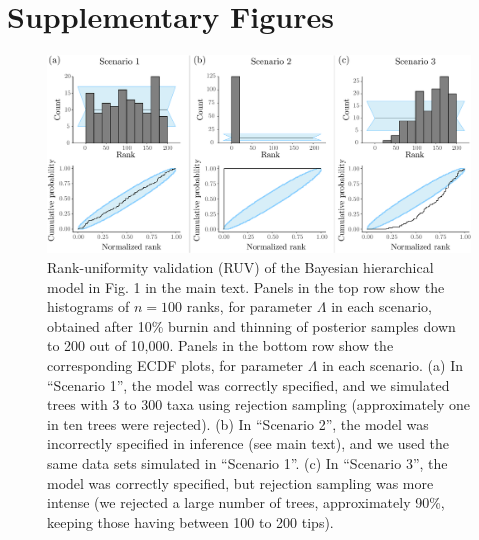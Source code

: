 \documentclass[oneside]{article}
\begin{document}
\newpage
\section{Supplementary Figures}
\label{appendix::sec:supp_figures}

\begin{figure}[!ht]
   \includegraphics[width=\linewidth]{../figures/sbc_Yule_lambda_manual.pdf}
  \caption{Rank-uniformity validation (RUV) of the Bayesian hierarchical model in Fig. 1 in the main text.
    Panels in the top row show the histograms of $n=100$ ranks, for parameter $\Lambda$ in each scenario, obtained after 10\% burnin and thinning of posterior samples down to 200 out of 10,000.
    Panels in the bottom row show the corresponding ECDF plots, for parameter $\Lambda$ in each scenario.
    (a) In ``Scenario 1'', the model was correctly specified, and we simulated trees with 3 to 300 taxa using rejection sampling (approximately one in ten trees were rejected).
    (b) In ``Scenario 2'', the model was incorrectly specified in inference (see main text), and we used the same data sets simulated in ``Scenario 1''.
    (c) In ``Scenario 3'', the model was correctly specified, but rejection sampling was more intense (we rejected a large number of trees, approximately 90\%, keeping those having between 100 to 200 tips).
   }
  \label{supfig:ruv_yule_lambda}
\end{figure}



\end{document}
